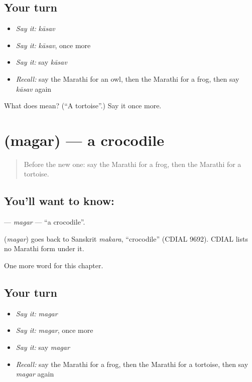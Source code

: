 \subsection*{Your turn}
\begin{itemize}
\raggedright
  \item \emph{Say it:} \emph{kāsav}
  \item \emph{Say it:} \emph{kāsav}, once more
  \item \emph{Say it:} say \emph{kāsav}
  \item \emph{Recall:} say the Marathi for an owl, then the Marathi for a frog, then say \emph{kāsav} again
\end{itemize}

\begin{tcolorbox}[breakable,colback=teal!4,colframe=teal!35!black,title={Before you move on}]
What does  mean? (\textquotedblleft{}A tortoise\textquotedblright{}.) Say it once more.
\end{tcolorbox}
\section[\texorpdfstring{\mr{मगर} (magar)}{मगर (magar)}]{ (magar) — a crocodile}

\label{lesson:MR-C143-magar}



\begin{quote}
Before the new one: say the Marathi for a frog, then the Marathi for a tortoise.
\end{quote}

\subsection*{You'll want to know: }
\textbf{} — \emph{magar} — \textquotedblleft{}a crocodile\textquotedblright{}.

\begin{cousinweb}
\textbf{} (\emph{magar}) goes back to Sanskrit \emph{makara}, \textquotedblleft{}crocodile\textquotedblright{} (CDIAL 9692). CDIAL lists no Marathi form under it.
\end{cousinweb}

\begin{grammarlens}[title={What you've built}]
One more word for this chapter.
\end{grammarlens}

\subsection*{Your turn}
\begin{itemize}
\raggedright
  \item \emph{Say it:} \emph{magar}
  \item \emph{Say it:} \emph{magar}, once more
  \item \emph{Say it:} say \emph{magar}
  \item \emph{Recall:} say the Marathi for a frog, then the Marathi for a tortoise, then say \emph{magar} again
\end{itemize}

